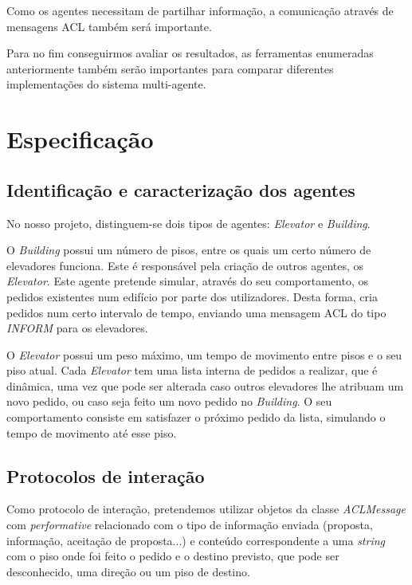 \documentclass[a4paper]{article}
\begin{document}
Como os agentes necessitam de partilhar informação, a comunicação através de mensagens ACL também será importante.

Para no fim conseguirmos avaliar os resultados, as ferramentas enumeradas anteriormente também serão importantes para comparar diferentes implementações do sistema multi-agente.

\newpage

\section{Especificação}

\subsection{Identificação e caracterização dos agentes} 

No nosso projeto, distinguem-se dois tipos de agentes: \textit{Elevator} e \textit{Building}.

O \textit{Building} possui um número de pisos, entre os quais um certo número de elevadores funciona. Este é responsável pela criação de outros agentes, os \textit{Elevator}. Este agente pretende simular, através do seu comportamento, os pedidos existentes num edifício por parte dos utilizadores. Desta forma, cria pedidos num certo intervalo de tempo, enviando uma mensagem ACL do tipo \textit{INFORM} para os elevadores.

O \textit{Elevator} possui um peso máximo, um tempo de movimento entre pisos e o seu piso atual. Cada \textit{Elevator} tem uma lista interna de pedidos a realizar, que é dinâmica, uma vez que pode ser alterada caso outros elevadores lhe atribuam um novo pedido, ou caso seja feito um novo pedido no \textit{Building}. O seu comportamento consiste em satisfazer o próximo pedido da lista, simulando o tempo de movimento até esse piso.

\subsection{Protocolos de interação} 

Como protocolo de interação, pretendemos utilizar objetos da classe \textit{ACLMessage} com \textit{performative} relacionado com o tipo de informação enviada (proposta, informação, aceitação de proposta...) e conteúdo correspondente a uma \textit{string} com o piso onde foi feito o pedido e o destino previsto, que pode ser desconhecido, uma direção ou um piso de destino.
\end{document}
